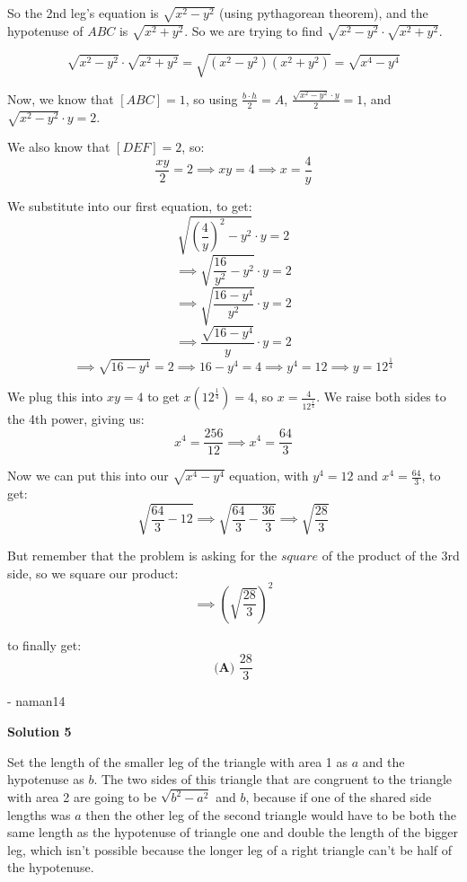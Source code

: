 \begin{enumerate}
 So the 2nd leg's equation is $\sqrt{x^2 - y^2}$ (using pythagorean theorem), and the hypotenuse of $ABC$ is $\sqrt{x^2 + y^2}$. So we are trying to find $\sqrt{x^2 - y^2} \cdot \sqrt{x^2 + y^2}$. 

 
 \[\sqrt{x^2 - y^2} \cdot \sqrt{x^2 + y^2} = \sqrt{(x^2 - y^2)(x^2+y^2)} = \sqrt{x^4-y^4}\]

 Now, we know that $[ABC]=1$, so using $\frac{b \cdot h}{2}=A$, $\frac{\sqrt{x^2 - y^2} \cdot y}{2}=1$, and $\sqrt{x^2 - y^2} \cdot y=2$. 

 We also know that $[DEF]=2$, so:
 \[\frac{xy}{2}=2 \implies xy=4 \implies x=\frac{4}{y}\]

 We substitute into our first equation, to get:
 \[\sqrt{\left(\frac{4}{y}\right)^2 - y^2} \cdot y=2\]
 \[\implies \sqrt{\frac{16}{y^2} - y^2} \cdot y=2\]
 \[\implies \sqrt{\frac{16-y^4}{y^2}} \cdot y=2\]
 \[\implies \frac{\sqrt{16-y^4}}{y} \cdot y=2\]
 \[\implies \sqrt{16-y^4}=2 \implies 16-y^4=4 \implies y^4=12 \implies y=12^{\frac{1}{4}}\]

 We plug this into $xy=4$ to get $x\left(12^{\frac{1}{4}}\right)=4$, so $x=\frac{4}{12^{\frac{1}{4}}}$. We raise both sides to the 4th power, giving us:
 \[x^4=\frac{256}{12} \implies x^4=\frac{64}{3}\]

 Now we can put this into our $\sqrt{x^4-y^4}$ equation, with $y^4=12$ and $x^4=\frac{64}{3}$, to get:
 \[\sqrt{\frac{64}{3}-12} \implies \sqrt{\frac{64}{3}-\frac{36}{3}} \implies \sqrt{\frac{28}{3}}\]

 But remember that the problem is asking for the $\textit{square}$ of the product of the 3rd side, so we square our product:
 \[\implies \left(\sqrt{\frac{28}{3}}\right)^2\]

 to finally get:
 \[\boxed{\textbf{(A) } \frac{28}{3}}\]

 - naman14

 



\textbf{Solution 5}

Set the length of the smaller leg of the triangle with area 1 as $a$ and the hypotenuse as $b$. The two sides of this triangle that are congruent to the triangle with area 2 are going to be $\sqrt{b^2-a^2}$ and $b$, because if one of the shared side lengths was $a$ then the other leg of the second triangle would have to be both the same length as the hypotenuse of triangle one and double the length of the bigger leg, which isn't possible because the longer leg of a right triangle can't be half of the hypotenuse.


\end{enumerate}
